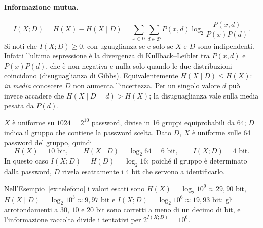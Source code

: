 \paragraph{Informazione mutua.}
\[
    \boxed{
        I(X;D) = H(X) - H(X \mid D) = \sum_{x \in \Omega} \sum_{d \in \mathcal{D}} P(x, d) \log_2 \frac{P(x, d)}{P(x) P(d)}.
    }
\]
Si noti che \(I(X;D) \geq 0\), con uguaglianza se e solo se \(X\) e \(D\) sono indipendenti. Infatti l'ultima espressione è la divergenza di Kullback--Leibler tra \(P(x,d)\) e \(P(x)P(d)\), che è non negativa e nulla solo quando le due distribuzioni coincidono (disuguaglianza di Gibbs). Equivalentemente \(H(X \mid D) \leq H(X)\): \emph{in media} conoscere \(D\) non aumenta l'incertezza. Per un singolo valore \(d\) può invece accadere che \(H(X \mid D = d) > H(X)\); la disuguaglianza vale sulla media pesata da \(P(d)\).

\begin{example}
    \(X\) è uniforme su \(1024 = 2^{10}\) password, divise in 16 gruppi equiprobabili da 64; \(D\) indica il gruppo che contiene la password scelta. Dato \(D\), \(X\) è uniforme sulle 64 password del gruppo, quindi
    \[
        H(X) = 10 \text{ bit}, \qquad H(X \mid D) = \log_2 64 = 6 \text{ bit}, \qquad I(X;D) = 4 \text{ bit}.
    \]
    In questo caso \(I(X;D) = H(D) = \log_2 16\): poiché il gruppo è determinato dalla password, \(D\) rivela esattamente i 4 bit che servono a identificarlo.
\end{example}

\begin{example}
    Nell'Esempio~\ref{ex:telefono} i valori esatti sono \(H(X) = \log_2 10^9 \approx 29{,}90\) bit, \(H(X \mid D) = \log_2 10^3 \approx 9{,}97\) bit e \(I(X;D) = \log_2 10^6 \approx 19{,}93\) bit: gli arrotondamenti a \(30\), \(10\) e \(20\) bit sono corretti a meno di un decimo di bit, e l'informazione raccolta divide i tentativi per \(2^{I(X;D)} = 10^6\).
\end{example}



